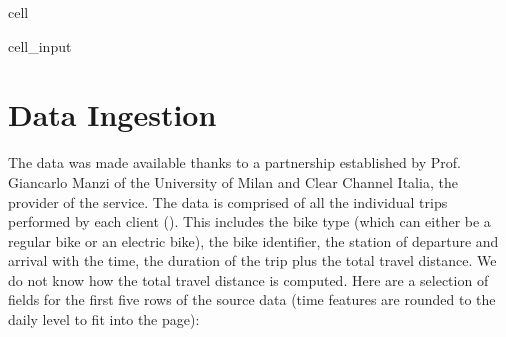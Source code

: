 \documentclass[letterpaper,10pt,english]{jupyterBook}
\begin{document}
\begin{sphinxuseclass}{cell}
\begin{sphinxuseclass}{cell_input}
\begin{sphinxVerbatim}[commandchars=\\\{\}]
  

  
\end{sphinxVerbatim}

\end{sphinxuseclass}
\end{sphinxuseclass}

\section{Data Ingestion}
\label{\detokenize{03-data_ingestion_and_spatial_operations:data-ingestion}}
\sphinxAtStartPar
The data was made available thanks to a partnership established by Prof. Giancarlo Manzi of the University of Milan and Clear Channel Italia, the provider of the service. The data is comprised of all the individual trips performed by each client (). This includes the bike type (which can either be a regular bike or an electric bike), the bike identifier, the station of departure and arrival with the time, the duration of the trip  plus the total travel distance. We do not know how the total travel distance  is computed. Here are a selection of fields for the first five rows of the source data (time features are rounded to the daily level to fit into the page):
\end{document}
